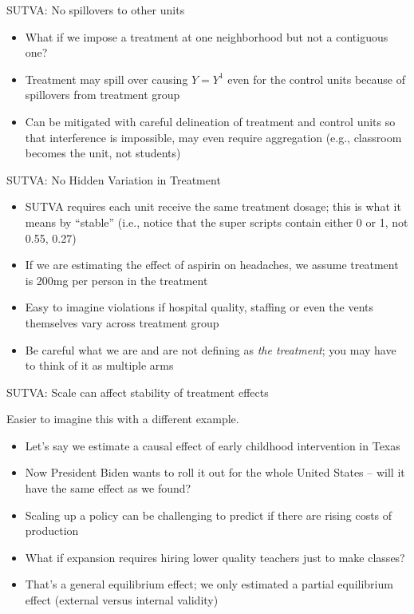 \documentclass{beamer}
\begin{document}
\begin{frame}{SUTVA: No spillovers to other units}

  \begin{itemize}
    \item What if we impose a treatment at one neighborhood but not a contiguous one?
    \item Treatment may spill over causing $Y=Y^1$ even for the control units because of spillovers from treatment group
    \item Can be mitigated with careful delineation of treatment and control units so that interference is impossible, may even require aggregation (e.g., classroom becomes the unit, not students)
  \end{itemize}
\end{frame}



\begin{frame}{SUTVA: No Hidden Variation in Treatment}

  \begin{itemize}
    \item SUTVA requires each unit receive the same treatment dosage; this is what it means by ``stable'' (i.e., notice that the super scripts contain either 0 or 1, not 0.55, 0.27)
    \item If we are estimating the effect of aspirin on headaches, we assume treatment is 200mg per person in the treatment
    \item Easy to imagine violations if hospital quality, staffing or even the vents themselves vary across treatment group
    \item Be careful what we are and are not defining as \emph{the treatment}; you may have to think of it as multiple arms
  \end{itemize}
\end{frame}

\begin{frame}{SUTVA: Scale can affect stability of treatment effects}

  Easier to imagine this with a different example.
  \begin{itemize}
    \item Let's say we estimate a causal effect of early childhood intervention in Texas
    \item Now President Biden wants to roll it out for the whole United States -- will it have the same effect as we found?
    \item Scaling up a policy can be challenging to predict if there are rising costs of production
    \item What if expansion requires hiring lower quality teachers just to make classes?
    \item That's a general equilibrium effect; we only estimated a partial equilibrium effect (external versus internal validity)
  \end{itemize}
\end{frame}
\end{document}
